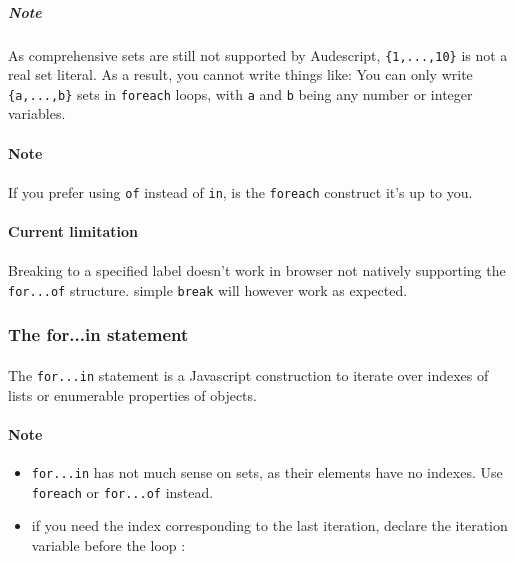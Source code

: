 \documentclass{article}
\let\subsubsubsection\paragraph
\let\subsubsubsubsection\subparagraph
\begin{document}
\begin{sloppypar}
            

\subsubsubsubsection{ Note\\}
\paragraph{}
As comprehensive sets are still not supported by Audescript, \verb!{1,...,10}! is not a real set literal. As a result, you cannot write things like:
               {}
               You can only write \verb!{a,...,b}! sets in \verb!foreach! loops, with \verb!a! and \verb!b! being any number or integer variables.
            
         
         
         

\subsubsubsection{ Note\\}
\paragraph{}
If you prefer using \verb!of! instead of \verb!in!, is  the \verb!foreach! construct it's up to you.
         
         
         

\subsubsubsection{ Current limitation\\}
\paragraph{}
Breaking to a specified label doesn't work in browser not natively supporting the \verb!for...of! structure. simple \verb!break! will however work as expected.
         
      
      
      

\subsubsection{ The for...in statement}


\paragraph{}
The \verb!for...in! statement is a Javascript construction to iterate over indexes of lists or enumerable properties of objects.
         {}
         

\subsubsubsection{ Note\\}
\begin{itemize}
	\item{ \verb!for...in! has not much sense on sets, as their elements have no indexes. Use \verb!foreach! or \verb!for...of! instead.}
	\item{                if you need the index corresponding to the last iteration, declare the iteration variable before the loop :
               
}
\end{itemize}
\end{sloppypar}
\end{document}
